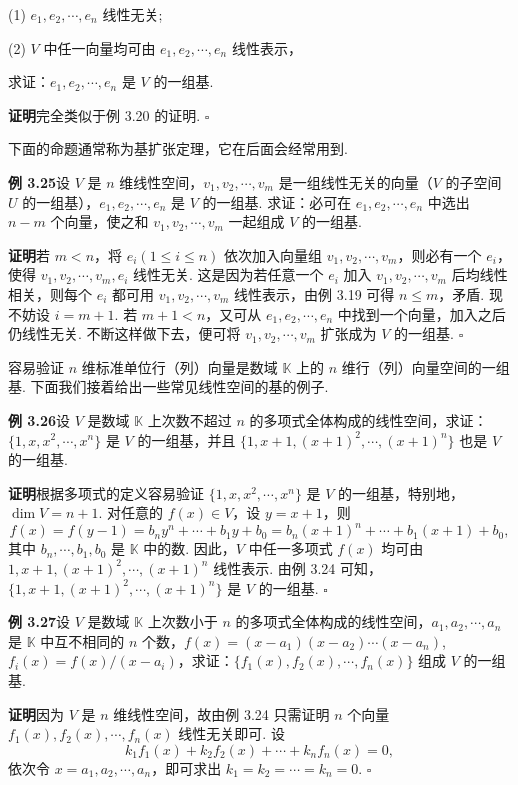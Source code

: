 \documentclass[UTF8, 12pt, fontset=fandol, oneside]{ctexart}
\begin{document}
(1) $e_1,e_2,\cdots,e_n$ 线性无关;

(2) $V$ 中任一向量均可由 $e_1,e_2,\cdots,e_n$ 线性表示，

求证：$e_1,e_2,\cdots,e_n$ 是 $V$ 的一组基.

\noindent\textbf{证明}\quad 完全类似于例 3.20 的证明. $\square$

下面的命题通常称为基扩张定理，它在后面会经常用到.

\noindent\textbf{例 3.25}\quad 设 $V$ 是 $n$ 维线性空间，$v_1,v_2,\cdots,v_m$ 是一组线性无关的向量（$V$ 的子空间 $U$ 的一组基），$e_1,e_2,\cdots,e_n$ 是 $V$ 的一组基. 求证：必可在 $e_1,e_2,\cdots,e_n$ 中选出 $n-m$ 个向量，使之和 $v_1,v_2,\cdots,v_m$ 一起组成 $V$ 的一组基.

\noindent\textbf{证明}\quad 若 $m<n$，将 $e_i(1\le i\le n)$ 依次加入向量组 $v_1,v_2,\cdots,v_m$，则必有一个 $e_i$，使得 $v_1,v_2,\cdots,v_m,e_i$ 线性无关. 这是因为若任意一个 $e_i$ 加入 $v_1,v_2,\cdots,v_m$ 后均线性相关，则每个 $e_i$ 都可用 $v_1,v_2,\cdots,v_m$ 线性表示，由例 3.19 可得 $n\le m$，矛盾. 现不妨设 $i=m+1$. 若 $m+1<n$，又可从 $e_1,e_2,\cdots,e_n$ 中找到一个向量，加入之后仍线性无关. 不断这样做下去，便可将 $v_1,v_2,\cdots,v_m$ 扩张成为 $V$ 的一组基. $\square$

容易验证 $n$ 维标准单位行（列）向量是数域 $\mathbb{K}$ 上的 $n$ 维行（列）向量空间的一组基. 下面我们接着给出一些常见线性空间的基的例子.

\noindent\textbf{例 3.26}\quad 设 $V$ 是数域 $\mathbb{K}$ 上次数不超过 $n$ 的多项式全体构成的线性空间，求证：$\{1,x,x^2,\cdots,x^n\}$ 是 $V$ 的一组基，并且 $\{1,x+1,(x+1)^2,\cdots,(x+1)^n\}$ 也是 $V$ 的一组基.

\noindent\textbf{证明}\quad 根据多项式的定义容易验证 $\{1,x,x^2,\cdots,x^n\}$ 是 $V$ 的一组基，特别地，$\dim V=n+1$. 对任意的 $f(x)\in V$，设 $y=x+1$，则
\[
f(x)=f(y-1)=b_ny^n+\cdots+b_1y+b_0=b_n(x+1)^n+\cdots+b_1(x+1)+b_0,
\]
其中 $b_n,\cdots,b_1,b_0$ 是 $\mathbb{K}$ 中的数. 因此，$V$ 中任一多项式 $f(x)$ 均可由 $1,x+1,(x+1)^2,\cdots,(x+1)^n$ 线性表示. 由例 3.24 可知，$\{1,x+1,(x+1)^2,\cdots,(x+1)^n\}$ 是 $V$ 的一组基. $\square$

\noindent\textbf{例 3.27}\quad 设 $V$ 是数域 $\mathbb{K}$ 上次数小于 $n$ 的多项式全体构成的线性空间，$a_1,a_2,\cdots,a_n$ 是 $\mathbb{K}$ 中互不相同的 $n$ 个数，$f(x)=(x-a_1)(x-a_2)\cdots(x-a_n)$, $f_i(x)=f(x)/(x-a_i)$，求证：$\{f_1(x),f_2(x),\cdots,f_n(x)\}$ 组成 $V$ 的一组基.

\noindent\textbf{证明}\quad 因为 $V$ 是 $n$ 维线性空间，故由例 3.24 只需证明 $n$ 个向量 $f_1(x),f_2(x),\cdots,f_n(x)$ 线性无关即可. 设
\[
k_1f_1(x)+k_2f_2(x)+\cdots+k_nf_n(x)=0,
\]
依次令 $x=a_1,a_2,\cdots,a_n$，即可求出 $k_1=k_2=\cdots=k_n=0$. $\square$
\end{document}
